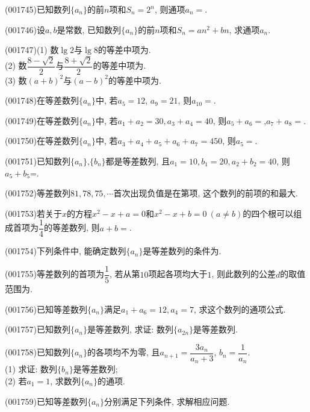 \item (001745)已知数列$\{a_n\}$的前$n$项和$S_n=2^n$, 则通项$a_n=$.
\item (001746)设$a,b$是常数, 已知数列$\{a_n\}$的前$n$项和$S_n=an^2+bn$, 求通项$a_n$.
\item (001747)(1) 数$\lg 2$与$\lg 8$的等差中项为.\\ 
(2) 数$\dfrac{8-\sqrt{2}}{2}$与$\dfrac{8+\sqrt{2}}{2}$的等差中项为.\\ 
(3) 数$(a+b)^2$与$(a-b)^2$的等差中项为.
\item (001748)在等差数列$\{a_n\}$中, 若$a_5=12$, $a_9=21$, 则$a_{10}=$.
\item (001749)在等差数列$\{a_n\}$中, 若$a_1+a_2=30,a_3+a_4=40$, 则$a_5+a_6=$,$a_7+a_8=$.
\item (001750)在等差数列$\{a_n\}$中, 若$a_3+a_4+a_5+a_6+a_7=450$, 则$a_5=$.
\item (001751)已知数列$\{a_n\}$,$\{b_n\}$都是等差数列, 且$a_1=10,b_1=20,a_2+b_2=40$, 则$a_5+b_5$=.
\item (001752)等差数列$81,78,75,\cdots$首次出现负值是在第项, 这个数列的前项的和最大.
\item (001753)若关于$x$的方程$x^2-x+a=0$和$x^2-x+b=0\ (a\ne b)$的四个根可以组成首项为$\dfrac{1}{4}$的等差数列, 则$a+b=$.
\item (001754)下列条件中, 能确定数列$\{a_n\}$是等差数列的条件为.
\item (001755)等差数列的首项为$\dfrac{1}{5}$, 若从第$10$项起各项均大于$1$, 则此数列的公差$d$的取值范围为.
\item (001756)已知等差数列$\{a_n\}$满足$a_1+a_6=12,a_4=7$, 求这个数列的通项公式.
\item (001757)已知数列$\{a_n\}$是等差数列, 求证: 数列$\{a_{2n}\}$是等差数列.
\item (001758)已知数列$\{a_n\}$的各项均不为零, 且$a_{n+1}=\dfrac{3a_n}{a_n+3}$, $b_n=\dfrac{1}{a_n}$. \\ 
(1) 求证: 数列$\{b_n\}$是等差数列;\\ 
(2) 若$a_1=1$, 求数列$\{a_n\}$的通项.
\item (001759)已知等差数列$\{a_n\}$分别满足下列条件, 求解相应问题.\\ 
